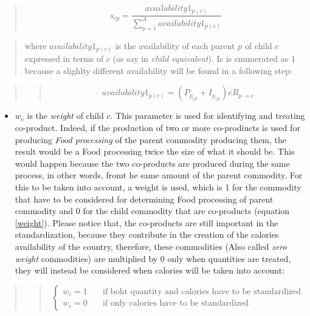 \documentclass[]{article}
\providecommand{\tightlist}{%
  \setlength{\itemsep}{0pt}\setlength{\parskip}{0pt}}
\begin{document}
\begin{quote}
\begin{equation}
\label{shares}
s_{cp} = \frac{availability1_{p(c)}}{\sum \limits_{p=1}^A{availability1_{p(c)}}}
\end{equation}
\end{quote}

\begin{quote}
where \(availability1_{p(c)}\) is the availability of each parent \(p\)
of child \(c\) expressed in terms of \(c\) (as say in \emph{child
equivalent}). Is is enumerated as \(1\) because a slighlty different
availability will be found in a following step:
\end{quote}

\begin{quote}
\begin{quote}
\begin{equation}
\label{availability 1}
availability1_{p(c)} = (P_{p_{ijt}} + I_{p_{ijt}})eR_{p\to c}
\end{equation}
\end{quote}
\end{quote}

\begin{itemize}
\tightlist
\item
  \(w_{c}\) is the \emph{weight} of child \(c\). This parameter is used
  for identifying and treating co-product. Indeed, if the production of
  two or more co-prodiucts is used for producing \emph{Food processing}
  of the parent commodity producing them, the result would be a Food
  processing twice the size of what it should be. This would happen
  because the two co-products are produced during the same process, in
  other words, fromt he same amount of the parent commodity. For this to
  be taken into account, a weight is used, which is 1 for the commodity
  that have to be considered for determining Food processing of parent
  commodity and 0 for the child commodity that are co-products (equation
  \ref{weight}). Please notice that, the co-products are still important
  in the standardization, because they contribute in the creation of the
  calories availability of the country, therefore, these commodities
  (Also called \emph{zero weight} commodities) are multiplied by 0 only
  when quantities are treated, they will instead be considered when
  calories will be taken into account:
\end{itemize}

\begin{quote}
\begin{quote}
\begin{equation}
\label{weight}
\begin{cases}
w_{c} = 1      & \quad \text{if boht quantity and calories have to be standardized} \\
w_{c} = 0      & \quad \text{if only calories have to be standardized}
\end{cases}
\end{equation}
\end{quote}
\end{quote}
\end{document}
